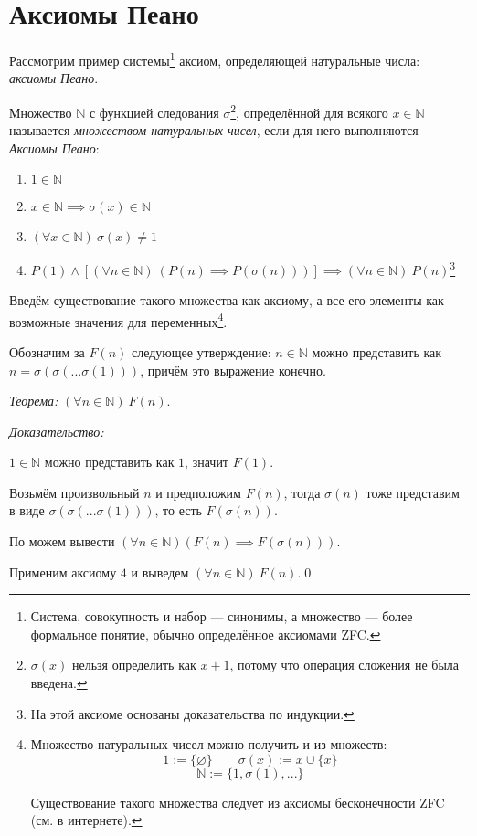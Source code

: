 \section{Аксиомы Пеано}

Рассмотрим пример системы\footnote{
	Система, совокупность и набор --- синонимы, а множество --- более формальное
	понятие, обычно определённое аксиомами ZFC.
} аксиом, определяющей натуральные числа: {\it аксиомы Пеано}.

\newcommand\N{\mathbb{N}}
Множество $\N$ с функцией следования $\sigma$\footnote{$\sigma(x)$ нельзя определить
	как $x+1$, потому что операция сложения не была введена.},
определённой для всякого $x\in\N$
называется {\it множеством натуральных чисел}, если для него
выполняются {\it Аксиомы Пеано}:
\begin{enumerate}
	\item{}$1\in \N$
	\item{}$x\in\N\implies \sigma(x)\in\N$
	\item{}$(\forall x\in\N)~\sigma(x)\neq 1$
	\item{}$P(1)\land [(\forall n\in\N)~(P(n)\implies P(\sigma(n)))]
		\implies(\forall n\in\N)~P(n)$\footnote{На этой аксиоме основаны
		доказательства по индукции.}
\end{enumerate}

Введём существование такого множества как аксиому, а
все его элементы как
возможные значения для переменных\footnote{Множество натуральных чисел можно
	получить и из множеств:
	\[
		1:=\{\varnothing\}\qquad\sigma(x):=x\cup \{x\}
	\]
	\[
		\N:=\{1,\sigma(1),...\}
	\]

	Существование такого множества следует из
	аксиомы бесконечности ZFC (см. в интернете).}.

Обозначим за $F(n)$ следующее утверждение: ${n\in\N}$ можно представить как
$n=\sigma(\sigma(...\sigma(1)))$, причём это выражение конечно.

{\it Теорема:} $(\forall n\in\N)~F(n)$.

	{\it Доказательство:}

$1\in\N$ можно представить как $1$, значит $F(1)$.

Возьмём произвольный $n$ и предположим $F(n)$, тогда $\sigma(n)$ тоже
представим в виде $\sigma(\sigma(...\sigma(1)))$, то есть $F(\sigma(n))$.

По \Aii{} можем вывести $(\forall n\in\N)(F(n)\implies F(\sigma(n)))$.

Применим аксиому $4$ и выведем $(\forall n\in\N)~F(n)$.\qed

